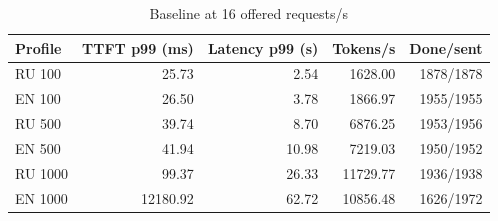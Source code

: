 \begin{table}[htbp]
\centering
\caption{Baseline at 16 offered requests/s}
\label{tab:load16}
\begin{singlespace}
\small
\setlength{\tabcolsep}{4pt}
\renewcommand{\arraystretch}{1.2}
\begin{tabular}{@{}lrrrr@{}}
\toprule
Profile & TTFT p99 (ms) & Latency p99 (s) & Tokens/s & Done/sent \\
\midrule
RU 100 & 25.73 & 2.54 & 1628.00 & 1878/1878 \\
EN 100 & 26.50 & 3.78 & 1866.97 & 1955/1955 \\
RU 500 & 39.74 & 8.70 & 6876.25 & 1953/1956 \\
EN 500 & 41.94 & 10.98 & 7219.03 & 1950/1952 \\
RU 1000 & 99.37 & 26.33 & 11729.77 & 1936/1938 \\
EN 1000 & 12180.92 & 62.72 & 10856.48 & 1626/1972 \\
\bottomrule
\end{tabular}

\end{singlespace}
\end{table}
